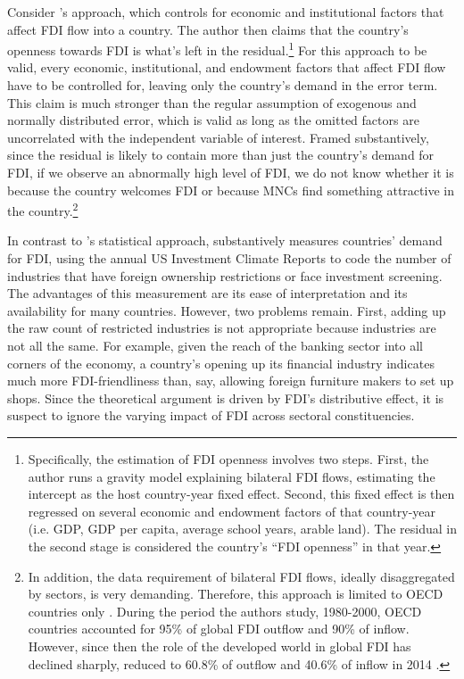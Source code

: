 Consider \citet{Pinto2013}'s approach, which controls for economic and
institutional factors that affect FDI flow into a country. The author then
claims that the country's openness towards FDI is what's left in the
residual.\footnote{Specifically, the estimation of FDI openness involves two
steps. First, the author runs a gravity model explaining bilateral FDI flows,
estimating the intercept as the host country-year fixed effect. Second, this
fixed effect is then regressed on several economic and endowment factors of that
country-year (i.e. GDP, GDP per capita, average school years, arable land). The
residual in the second stage is considered the country's ``FDI openness'' in
that year.} For this approach to be valid, every economic, institutional, and
endowment factors that affect FDI flow have to be controlled for, leaving only
the country's demand in the error term. This claim is much stronger than the
regular assumption of exogenous and normally distributed error, which is valid
as long as the omitted factors are uncorrelated with the independent variable of
interest. Framed substantively, since the residual is likely to contain more
than just the country's demand for FDI, if we observe an abnormally high level
of FDI, we do not know whether it is because the country welcomes FDI or because
MNCs find something attractive in the country.\footnote{In addition, the data
requirement of bilateral FDI flows, ideally disaggregated by sectors, is very
demanding. Therefore, this approach is limited to OECD countries only
\citep{Pinto2008}. During the period the authors study, 1980-2000, OECD
countries accounted for 95\% of global FDI outflow and 90\% of inflow. However,
since then the role of the developed world in global FDI has declined sharply,
reduced to 60.8\% of outflow and 40.6\% of inflow in 2014 \citep{UNCTAD2015}.}

In contrast to \citet{Pinto2013}'s statistical approach, \citet{Pandya2014,
Pandya2016} substantively measures countries' demand for FDI, using the annual
US Investment Climate Reports to code the number of industries that have foreign
ownership restrictions or face investment screening. The advantages of this
measurement are its ease of interpretation and its availability for many
countries. However, two problems remain. First, adding up the raw count of
restricted industries is not appropriate because industries are not all the
same. For example, given the reach of the banking sector into all corners of the
economy, a country's opening up its financial industry indicates much more
FDI-friendliness than, say, allowing foreign furniture makers to set up shops.
Since the theoretical argument is driven by FDI's distributive effect, it is
suspect to ignore the varying impact of FDI across sectoral constituencies.

